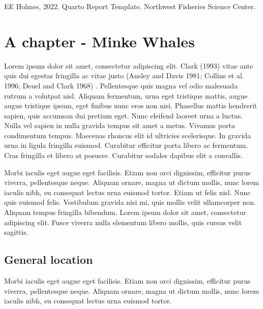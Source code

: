 \documentclass[
  letterpaper,
  oneside,
  open=any]{scrbook}
\begin{document}

EE Holmes, 2022. Quarto Report Template. Northwest Fisheries Science
Center.


\hypertarget{a-chapter---minke-whales}{%
\chapter{A chapter - Minke Whales}\label{a-chapter---minke-whales}}

Lorem ipsum dolor sit amet, consectetur adipiscing elit. Clark (1993)
vitae ante quis dui egestas fringilla ac vitae justo (Ansley and Davis
1981; Collins et al. 1996; Deuel and Clark 1968) . Pellentesque quis
magna vel odio malesuada rutrum a volutpat nisl. Aliquam fermentum, urna
eget tristique mattis, augue augue tristique ipsum, eget finibus nunc
eros non nisi. Phasellus mattis hendrerit sapien, quis accumsan dui
pretium eget. Nunc eleifend laoreet urna a luctus. Nulla vel sapien in
nulla gravida tempus sit amet a metus. Vivamus porta condimentum tempus.
Maecenas rhoncus elit id ultricies scelerisque. In gravida urna in
ligula fringilla euismod. Curabitur efficitur porta libero ac fermentum.
Cras fringilla et libero at posuere. Curabitur sodales dapibus elit a
convallis.

Morbi iaculis eget augue eget facilisis. Etiam non orci dignissim,
efficitur purus viverra, pellentesque neque. Aliquam ornare, magna ut
dictum mollis, nunc lorem iaculis nibh, eu consequat lectus urna euismod
tortor. Etiam ut felis nisl. Nunc quis euismod felis. Vestibulum gravida
nisi mi, quis mollis velit ullamcorper non. Aliquam tempus fringilla
bibendum. Lorem ipsum dolor sit amet, consectetur adipiscing elit. Fusce
viverra nulla elementum libero mollis, quis cursus velit sagittis.

\hypertarget{general-location}{%
\section{General location}\label{general-location}}

Morbi iaculis eget augue eget facilisis. Etiam non orci dignissim,
efficitur purus viverra, pellentesque neque. Aliquam ornare, magna ut
dictum mollis, nunc lorem iaculis nibh, eu consequat lectus urna euismod
tortor.
\end{document}
